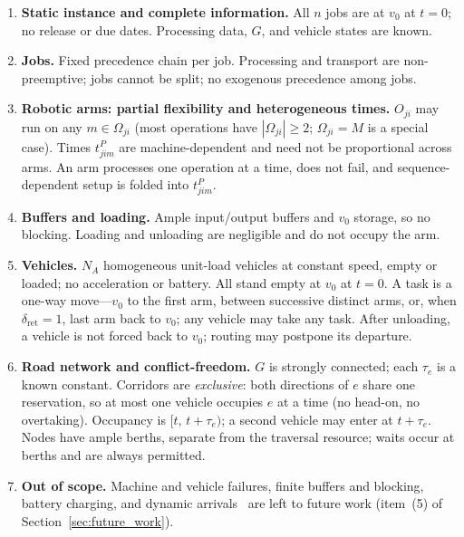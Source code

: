 \begin{enumerate}[label=\textbf{A\arabic*.},leftmargin=*,topsep=2pt,itemsep=1pt]
\item \textbf{Static instance and complete information.} All $n$ jobs are at $v_0$ at $t=0$; no release or due dates. Processing data, $G$, and vehicle states are known.

\item \textbf{Jobs.} Fixed precedence chain per job. Processing and transport are non-preemptive; jobs cannot be split; no exogenous precedence among jobs.

\item \textbf{Robotic arms: partial flexibility and heterogeneous times.} $O_{ji}$ may run on any $m\in\Omega_{ji}$ (most operations have $|\Omega_{ji}|\ge 2$; $\Omega_{ji}=M$ is a special case). Times $t^P_{jim}$ are machine-dependent and need not be proportional across arms. An arm processes one operation at a time, does not fail, and sequence-dependent setup is folded into $t^P_{jim}$.

\item \textbf{Buffers and loading.} Ample input/output buffers and $v_0$ storage, so no blocking. Loading and unloading are negligible and do not occupy the arm.

\item \textbf{Vehicles.} $N_A$ homogeneous unit-load vehicles at constant speed, empty or loaded; no acceleration or battery. All stand empty at $v_0$ at $t=0$. A task is a one-way move---$v_0$ to the first arm, between successive distinct arms, or, when $\delta_{\mathrm{ret}}=1$, last arm back to $v_0$; any vehicle may take any task. After unloading, a vehicle is not forced back to $v_0$; routing may postpone its departure.

\item \textbf{Road network and conflict-freedom.} $G$ is strongly connected; each $\tau_e$ is a known constant. Corridors are \emph{exclusive}: both directions of $e$ share one reservation, so at most one vehicle occupies $e$ at a time (no head-on, no overtaking). Occupancy is $[t,\,t+\tau_e)$; a second vehicle may enter at $t+\tau_e$. Nodes have ample berths, separate from the traversal resource; waits occur at berths and are always permitted.

\item \textbf{Out of scope.} Machine and vehicle failures, finite buffers and blocking, battery charging, and dynamic arrivals~\cite{gui2023dynamic,xiong2024dynamic} are left to future work (item~(5) of Section~\ref{sec:future_work}).
\end{enumerate}

